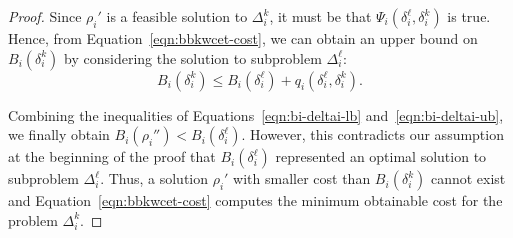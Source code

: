 \begin{proof}
Since $\rho_{i}'$ is a feasible solution to $\Delta_i^k$, it must be that $\Psi_i(\delta_i^{\ell}, \delta_i^k)$ is true.  Hence, from Equation~\ref{eqn:bbkwcet-cost}, we can obtain an upper bound on $B_i(\delta_i^k)$ by considering the solution to subproblem $\Delta_i^{\ell}$:
\begin{equation}\label{eqn:bi-deltai-ub}
    B_i(\delta_i^k) \leq B_i(\delta_i^{\ell}) + q_i(\delta_i^{\ell}, \delta_i^k).
\end{equation}

Combining the inequalities of Equations~\ref{eqn:bi-deltai-lb} and~\ref{eqn:bi-deltai-ub}, we finally obtain $B_i(\rho_{i}'') < B_i(\delta_i^{\ell})$.  However, this contradicts our assumption at the beginning of the proof that $B_i(\delta_i^{\ell})$ represented an optimal solution to subproblem $\Delta_i^{\ell}$.  Thus, a solution $\rho_{i}'$ with smaller cost than $B_i(\delta_i^k)$ cannot exist and Equation~\ref{eqn:bbkwcet-cost} computes the minimum obtainable cost for the problem $\Delta_i^k$.

\end{proof}
